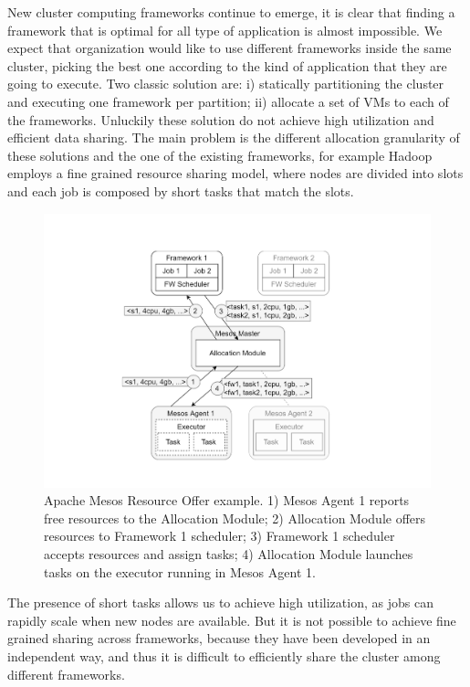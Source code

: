 New cluster computing frameworks continue to emerge, it is clear that finding a framework that is optimal for all type of application is almost impossible. We expect that organization would like to use different frameworks inside the same cluster, picking the best one according to the kind of application that they are going to execute. Two classic solution are: i) statically partitioning the cluster and executing one framework per partition; ii) allocate a set of VMs to each of the frameworks. Unluckily these solution do not achieve high utilization and efficient data sharing. The main problem is the different allocation granularity of these solutions and the one of the existing frameworks, for example Hadoop employs a fine grained resource sharing model, where nodes are divided into slots and each job is composed by short tasks that match the slots.
\begin{figure}
	\centering
	\includegraphics[width=\columnwidth]{Images/apache_mesos_resource_offer_example.pdf}  
	\caption[Apache Mesos Resource Offer Example]{Apache Mesos Resource Offer example. 1) Mesos Agent 1 reports
		free resources to the Allocation Module; 2) Allocation
		Module offers resources to Framework 1 scheduler; 3) Framework
		1 scheduler accepts resources and assign tasks; 4) Allocation
		Module launches tasks on the executor running in Mesos
		Agent 1.}
	\label{fig:apacheMesosResourceOfferExample}
\end{figure}
The presence of short tasks allows us to achieve high utilization, as jobs can rapidly scale when new nodes are available. But it is not possible to achieve fine grained sharing across frameworks, because they have been developed in an independent way, and thus it is difficult to efficiently share the cluster among different frameworks.

